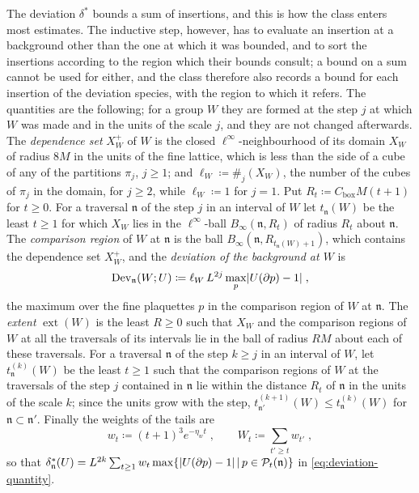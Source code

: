 \documentclass[11pt]{preprint}
\DeclarePairedDelimiter{\abs}{\lvert}{\rvert}
\numberwithin{equation}{section}
\theoremstyle{definition}
\theoremstyle{remark}
\theoremstyle{plain}
\begin{document}
The deviation $\delta^*$ bounds a sum of insertions, and this is how the class enters most estimates. The inductive step, however, has to evaluate an insertion at a background other than the one at which it was bounded, and to sort the insertions according to the region which their bounds consult; a bound on a sum cannot be used for either, and the class therefore also records a bound for each insertion of the deviation species, with the region to which it refers. The quantities are the following; for a group $W$ they are formed at the step $j$ at which $W$ was made and in the units of the scale $j$, and they are not changed afterwards. The \emph{dependence set} $X^+_W$ of $W$ is the closed $\ell^\infty$-neighbourhood of its domain $X_W$ of radius $8M$ in the units of the fine lattice, which is less than the side of a cube of any of the partitions $\pi_j$, $j \geq 1$; and $\ell_W \coloneqq \#_j(X_W)$, the number of the cubes of $\pi_j$ in the domain, for $j \geq 2$, while $\ell_W \coloneqq 1$ for $j = 1$. Put $R_t \coloneqq C_{\mathrm{box}}M(t + 1)$ for $t \geq 0$. For a traversal $\mathfrak n$ of the step $j$ in an interval of $W$ let $t_{\mathfrak n}(W)$ be the least $t \geq 1$ for which $X_W$ lies in the $\ell^\infty$-ball $B_\infty(\mathfrak n, R_t)$ of radius $R_t$ about $\mathfrak n$. The \emph{comparison region} of $W$ at $\mathfrak n$ is the ball $B_\infty(\mathfrak n, R_{t_{\mathfrak n}(W)+1})$, which contains the dependence set $X^+_W$, and the \emph{deviation of the background at $W$} is
\begin{equation}\label{eq:insertion-deviation}
    \operatorname{Dev}_{\mathfrak n}(W; U) \coloneqq \ell_W\,L^{2j}\max_p\abs{U(\partial p) - 1}\;,
\end{equation}
the maximum over the fine plaquettes $p$ in the comparison region of $W$ at $\mathfrak n$. The \emph{extent} $\operatorname{ext}(W)$ is the least $R \geq 0$ such that $X_W$ and the comparison regions of $W$ at all the traversals of its intervals lie in the ball of radius $RM$ about each of these traversals. For a traversal $\mathfrak n$ of the step $k \geq j$ in an interval of $W$, let $t^{(k)}_{\mathfrak n}(W)$ be the least $t \geq 1$ such that the comparison regions of $W$ at the traversals of the step $j$ contained in $\mathfrak n$ lie within the distance $R_t$ of $\mathfrak n$ in the units of the scale $k$; since the units grow with the step, $t^{(k+1)}_{\mathfrak n'}(W) \leq t^{(k)}_{\mathfrak n}(W)$ for $\mathfrak n \subset \mathfrak n'$. Finally the weights of the tails are
\begin{equation}\label{eq:tail-weights}
    w_t \coloneqq (t + 1)^3e^{-\eta_wt}\;,
    \qquad
    W_t \coloneqq \sum_{t' \geq t}w_{t'}\;,
\end{equation}
so that $\delta^*_{\mathfrak n}(U) = L^{2k}\sum_{t \geq 1}w_t\max\{ \abs{U(\partial p) - 1} \,|\, p \in \mathcal P_t(\mathfrak n) \}$ in \eqref{eq:deviation-quantity}.
\end{document}

